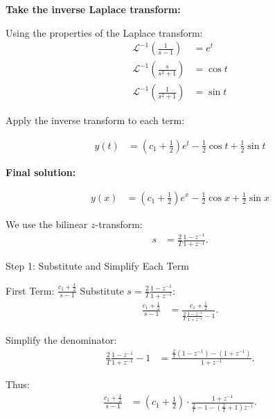 \documentclass[journal]{IEEEtran}
\begin{document}
	\textbf{Take the inverse Laplace transform:}
	
	Using the properties of the Laplace transform:
	\begin{align}
		\mathcal{L}^{-1}\left(\frac{1}{s - 1}\right) &= e^t \\
		\mathcal{L}^{-1}\left(\frac{s}{s^2 + 1}\right) &= \cos t \\
		\mathcal{L}^{-1}\left(\frac{1}{s^2 + 1}\right) &= \sin t
	\end{align}
	
	Apply the inverse transform to each term:
	
	\begin{align}
		y(t) &= \left(c_1 + \frac{1}{2}\right)e^t - \frac{1}{2}\cos t + \frac{1}{2}\sin t
	\end{align}
	
	\textbf{Final solution:}
	
	\begin{align}
		y(x) &= \left(c_1 + \frac{1}{2}\right)e^x - \frac{1}{2}\cos x + \frac{1}{2}\sin x
	\end{align}
	
	We use the bilinear $z$-transform:
	\begin{align}
		s &= \frac{2}{T} \frac{1 - z^{-1}}{1 + z^{-1}}.
	\end{align}
	
	Step 1: Substitute and Simplify Each Term
	
	First Term: $ \frac{c_1 + \frac{1}{2}}{s - 1} $
	Substitute $s = \frac{2}{T} \frac{1 - z^{-1}}{1 + z^{-1}}$:
	\begin{align}
		\frac{c_1 + \frac{1}{2}}{s - 1} &= \frac{c_1 + \frac{1}{2}}{\frac{2}{T} \frac{1 - z^{-1}}{1 + z^{-1}} - 1}.
	\end{align}
	
	Simplify the denominator:
	\begin{align}
		\frac{2}{T} \frac{1 - z^{-1}}{1 + z^{-1}} - 1 &= \frac{\frac{2}{T} (1 - z^{-1}) - (1 + z^{-1})}{1 + z^{-1}}.
	\end{align}
	
	Thus:
	\begin{align}
		\frac{c_1 + \frac{1}{2}}{s - 1} &= (c_1 + \frac{1}{2}) \cdot \frac{1 + z^{-1}}{\frac{2}{T} - 1 - \left(\frac{2}{T} + 1\right)z^{-1}}.
	\end{align}
	
\end{document}
